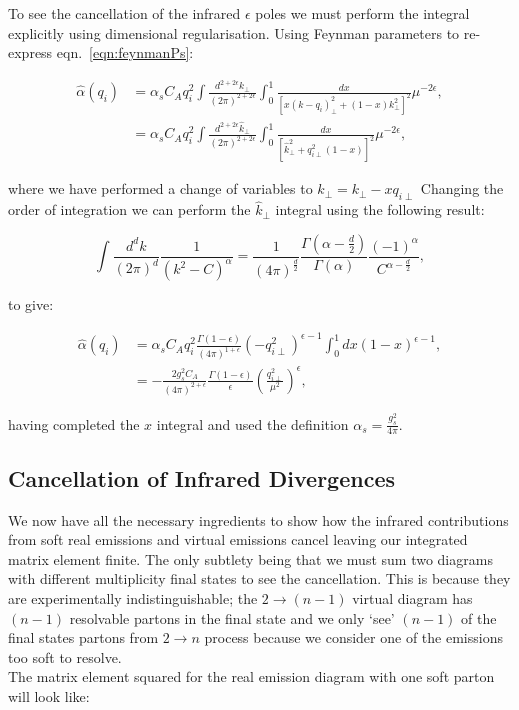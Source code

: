 		To see the cancellation of the infrared $\epsilon$ poles we must perform the integral
		explicitly using dimensional regularisation. Using Feynman parameters to re-express
		eqn.~\eqref{eqn:feynmanPs}:

		\begin{align}
			\hat{\alpha}(q_i) &= \alpha_sC_Aq_i^2\int \frac{d^{2+2\epsilon}k_{\perp}}{(2\pi)^{2+2\epsilon}}\int_0^1
				\frac{dx}{[x(k - q_{i})^2_\perp + (1-x)k_\perp^2]^2}\mu^{-2\epsilon}, \\
				&= \alpha_sC_Aq_i^2\int \frac{d^{2+2\epsilon}\hat{k}_{\perp}}{(2\pi)^{2+2\epsilon}}\int_0^1
				\frac{dx}{[\hat{k}^2 _\perp + q_{i\perp}^2(1-x)]^2}\mu^{-2\epsilon},
		\end{align}

		where we have performed a change of variables to $\hat{k}_\perp = k_\perp - xq_{i\perp}$
		Changing the order of integration we can perform the $\hat{k}_\perp$ integral
		using the following result:

		\begin{equation}
			\int \frac{d^dk}{(2\pi)^d}\frac{1}{(k^2 - C)^\alpha} = \frac{1}{(4\pi)^{\frac{d}{2}}}
				\frac{\Gamma(\alpha - \frac{d}{2})}{\Gamma(\alpha)}
				\frac{(-1)^\alpha}{C^{\alpha - \frac{d}{2}}},
		\end{equation}

		to give:

		\begin{align}
			\hat{\alpha}(q_i) &= \alpha_sC_Aq_i^2\frac{\Gamma(1-\epsilon)}{(4\pi)^{1+\epsilon}}
			(-q_{i\perp}^2)^{\epsilon-1}
			\int_0^1 dx(1-x)^{\epsilon-1}, \\
			&= -\frac{2g_s^2C_A}{(4\pi)^{2+\epsilon}}\frac{\Gamma(1-\epsilon)}{\epsilon}
			\left(\frac{q_{i\perp}^2}{\mu^2}\right)^\epsilon,
		\end{align}

		having completed the $x$ integral and used the definition $\alpha_s=\frac{g_s^2}{4\pi}$.

	\subsection{Cancellation of Infrared Divergences}
		\label{sub:cancellation}

		We now have all the necessary ingredients to show how the infrared contributions from
		soft real emissions and virtual emissions cancel leaving our integrated matrix element
		finite.  The only subtlety being that we must sum two diagrams with different multiplicity
		final states to see the cancellation.  This is because they are experimentally indistinguishable;
		the $2\rightarrow (n-1)$ virtual diagram has $(n-1)$ resolvable partons in the final state
		and we only `see' $(n-1)$ of the final states partons from $2\rightarrow n$ process because
		we consider one of the emissions too soft to resolve.\\
		The matrix element squared for the real emission diagram with one soft parton
		will look like:

